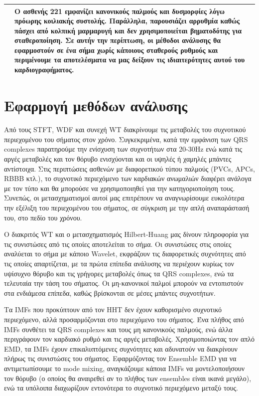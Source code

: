\documentclass[11pt,a4paper]{article}
\begin{document}
\begin{center}
\begin{tabular}{| >{\centering\arraybackslash}m{1cm} | >{\centering\arraybackslash}m{15cm}|}
 \hline
 221 & Ο ασθενής 221 εμφανίζει κανονικούς παλμούς και δυσμορφίες λόγω πρόωρης κοιλιακής συστολής. Παράλληλα, παρουσιάζει αρρυθμία καθώς πάσχει από κολπική μαρμαρυγή και δεν χρησιμοποιείται βηματοδότης για σταθεροποίηση. Σε αυτήν την περίπτωση, οι μέθοδοι ανάλυσης θα εφαρμοστούν σε ένα σήμα χωρίς κάποιους σταθερούς ρυθμούς και περιμένουμε τα αποτελέσματα να μας δείξουν τις ιδιαιτερότητες αυτού του καρδιογραφήματος. \\ 
 \hline
\end{tabular}
\end{center}


\section*{Εφαρμογή μεθόδων ανάλυσης}

Από τους STFT, WDF και συνεχή WT διακρίνουμε τις μεταβολές του συχνοτικού περιεχομένου του σήματος στον χρόνο. Συγκεκριμένα, κατά την εμφάνιση των QRS complexes παρατηρούμε την ενίσχυση των συχνοτήτων στα 20-30Hz ενώ κατά τις αργές μεταβολές και τον θόρυβο ενισχύονται και οι υψηλές ή χαμηλές μπάντες αντίστοιχα. Στις περιπτώσεις ασθενών με διαφορετικού τύπου παλμούς (PVCs, APCs, RBBB κτλ.), το συχνοτικό περιεχόμενο των καρδιακών ανωμαλιών διαφέρει ανάλογα με τον τύπο και θα μπορούσε να χρησιμοποιηθεί για την κατηγοριοποίηση τους. Συνεπώς, οι μετασχηματισμοί αυτοί μας επιτρέπουν να αναγνωρίσουμε ευκολότερα την εξέλιξη του περιεχομένου του σήματος, σε σύγκριση με την απλή αναπαράστασή του, στο πεδίο του χρόνου.

Ο διακριτός WT και ο μετασχηματισμός Hilbert-Huang μας δίνουν πληροφορία για τις συνιστώσες από τις οποίες αποτελείται το σήμα. 
Οι συνιστώσες στις οποίες αναλύεται το σήμα με κάποιο Wavelet, εκφράζουν τις διαφορετικές συχνότητες από τις οποίες απαρτίζεται, με τα πρώτα επίπεδα ανάλυσης να περιέχουν κυρίως τον υψίσυχνο θόρυβο και τις γρήγορες μεταβολές όπως τα QRS complexes, ενώ τα τελευταία την τάση του σήματος. Οι μη-κανονικοί παλμοί μπορούν να εντοπιστούν στα ενδιάμεσα επίπεδα, καθώς βρίσκονται σε μέσες μπάντες συχνοτήτων.

Τα IMFs που προκύπτουν από τον HHT δεν έχουν καθορισμένο συχνοτικό περιεχόμενο, αλλά προσαρμόζονται στο περιεχόμενο του σήματος. Ένα πλήθος από IMFs συνθέτει τα QRS complexes και τους μη κανονικούς παλμούς, ενώ άλλα περιγράφουν τον καρδιακό ρυθμό και τις αργές μεταβολές. Χρησιμοποιώντας τον απλό EMD, τα IMFs έχουν επικαλυπτόμενες συχνότητες και αδυνατούν να διακρίνουν πλήρως τις συνιστώσες του σήματος. Εφαρμόζοντας τον Ensemble EMD για να αντιμετωπίσουμε το mode mixing, αναγκάζουμε κάποια IMFs να μοντελοποιήσουν τον θόρυβο (ο οποίος θα αναιρεθεί αν το πλήθος των ensembles είναι ικανά μεγάλο), ενώ τα υπόλοιπα διαχωρίζουν εντονότερα το συχνοτικό περιεχόμενο μεταξύ τους.
\end{document}
